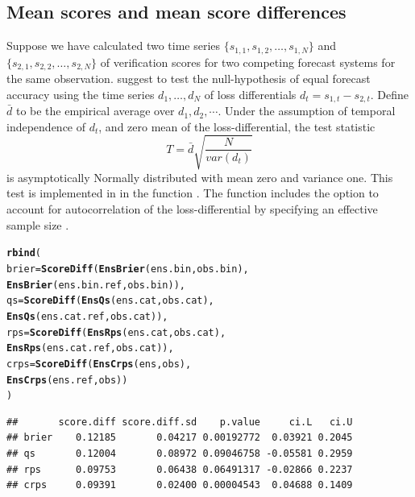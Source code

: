 \documentclass[article]{jss}\usepackage{graphicx, color}
\makeatletter
\newcommand{\hlfunctioncall}[1]{\textcolor[rgb]{0,0.501960784313725,0.752941176470588}{\textbf{#1}}}%
\newenvironment{kframe}{%
 \def\at@end@of@kframe{}%
 \ifinner\ifhmode%
  \def\at@end@of@kframe{\end{minipage}}%
  \begin{minipage}{\columnwidth}%
 \fi\fi%
 \def\FrameCommand##1{\hskip\@totalleftmargin \hskip-\fboxsep
 \colorbox{shadecolor}{##1}\hskip-\fboxsep
     \hskip-\linewidth \hskip-\@totalleftmargin \hskip\columnwidth}%
 \MakeFramed {\advance\hsize-\width
   \@totalleftmargin\z@ \linewidth\hsize
   \@setminipage}}%
 {\par\unskip\endMakeFramed%
 \at@end@of@kframe}
\newenvironment{knitrout}{}{} %
\makeatother
\begin{document}
\subsection{Mean scores and mean score differences}

Suppose we have calculated two time series $\{s_{1,1}, s_{1,2}, \dots, s_{1,N}\}$ and $\{s_{2,1}, s_{2,2}, \dots, s_{2,N}\}$ of verification scores for two competing forecast systems for the same observation.
\citet{diebold1995comparing} suggest to test the null-hypothesis of equal forecast accuracy using the time series $d_1, \dots, d_N$ of loss differentials $d_t = s_{1,t} - s_{2,t}$. 
Define $\bar{d}$ to be the empirical average over $d_1, d_2, \cdots$.
Under the assumption of temporal independence of $d_t$, and zero mean of the loss-differential, the test statistic 
%
\begin{equation}
T = \bar{d}\sqrt{\frac{N}{var(d_t)}}
\end{equation}
%
is asymptotically Normally distributed with mean zero and variance one.
This test is implemented in  in the function .
The function includes the option to account for autocorrelation of the loss-differential by specifying an effective sample size .

\begin{knitrout}
\color{fgcolor}\begin{kframe}
\begin{alltt}
\hlfunctioncall{rbind}(
  brier = \hlfunctioncall{ScoreDiff}(\hlfunctioncall{EnsBrier}(ens.bin, obs.bin), 
                    \hlfunctioncall{EnsBrier}(ens.bin.ref, obs.bin)),
  qs    = \hlfunctioncall{ScoreDiff}(\hlfunctioncall{EnsQs}(ens.cat, obs.cat),    
                    \hlfunctioncall{EnsQs}(ens.cat.ref, obs.cat)),
  rps   = \hlfunctioncall{ScoreDiff}(\hlfunctioncall{EnsRps}(ens.cat, obs.cat),   
                    \hlfunctioncall{EnsRps}(ens.cat.ref, obs.cat)),
  crps  = \hlfunctioncall{ScoreDiff}(\hlfunctioncall{EnsCrps}(ens, obs),          
                    \hlfunctioncall{EnsCrps}(ens.ref, obs))
)
\end{alltt}
\begin{verbatim}
##       score.diff score.diff.sd    p.value     ci.L   ci.U
## brier    0.12185       0.04217 0.00192772  0.03921 0.2045
## qs       0.12004       0.08972 0.09046758 -0.05581 0.2959
## rps      0.09753       0.06438 0.06491317 -0.02866 0.2237
## crps     0.09391       0.02400 0.00004543  0.04688 0.1409
\end{verbatim}
\end{kframe}
\end{knitrout}
\end{document}
